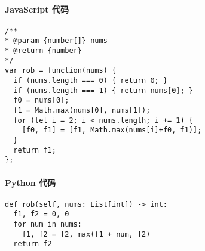 \paragraph{JavaScript 代码}

\begin{verbatim}
/**
* @param {number[]} nums
* @return {number}
*/
var rob = function(nums) {
  if (nums.length === 0) { return 0; }
  if (nums.length === 1) { return nums[0]; }
  f0 = nums[0];
  f1 = Math.max(nums[0], nums[1]);
  for (let i = 2; i < nums.length; i += 1) {
    [f0, f1] = [f1, Math.max(nums[i]+f0, f1)];
  }
  return f1;
};
\end{verbatim}

\paragraph{Python 代码}

\begin{verbatim}
def rob(self, nums: List[int]) -> int:
  f1, f2 = 0, 0
  for num in nums:
    f1, f2 = f2, max(f1 + num, f2)
  return f2
\end{verbatim}
